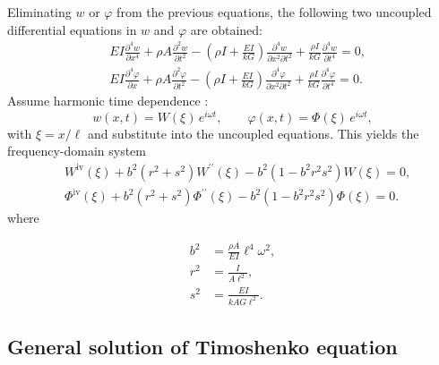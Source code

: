 \documentclass[11pt,a4paper]{article}
\begin{document}
Eliminating $w$ or $\varphi$ from the previous equations, the following two uncoupled differential equations in $w$ and $\varphi$ are obtained:
$$
      \begin{aligned}
             & E I \frac{\partial^4 w}{\partial x^4} + \rho A \frac{\partial^2 w}{\partial t^2} - \left(\rho I + \frac{E I}{k G}\right) \frac{\partial^4 w}{\partial x^2 \partial t^2} + \frac{\rho I}{k G} \frac{\partial^4 w}{\partial t^4} = 0,                        \\[1em]
             & E I \frac{\partial^4 \varphi}{\partial x} + \rho A \frac{\partial^2 \varphi}{\partial t^2} - \left(\rho I + \frac{E I}{k G} \right) \frac{\partial^4 \varphi}{\partial x^2 \partial t^2} + \frac{\rho I}{k G} \frac{\partial^4 \varphi}{\partial t^4} = 0.
      \end{aligned}
$$
Assume harmonic time dependence :
\[
      w(x,t)=W(\xi)\,e^{i\omega t},\qquad \varphi(x,t)=\Phi(\xi)\,e^{i\omega t},
\]
with $\xi=x/\ell$ and substitute into the uncoupled equations. This yields the frequency-domain system
$$
      \begin{aligned}
             & W^{\mathrm{iv}}(\xi) + b^2\left(r^2 + s^2\right) W^{\prime \prime}(\xi) - b^2 \left(1 - b^2 r^2 s^2\right) W(\xi) = 0,          \\[1em]
             & \Phi^{\mathrm{iv}}(\xi) + b^2\left(r^2 + s^2\right) \Phi^{\prime \prime}(\xi) - b^2 \left(1 - b^2 r^2 s^2\right) \Phi(\xi) = 0.
      \end{aligned}
$$
where

\begin{align}
      b^2 & =\frac{\rho A}{E I} \ell ^4 \omega^2, \label{btoomega} \\
      r^2 & =\frac{I}{A \ell^2}, \nonumber                         \\
      s^2 & =\frac{E I}{k A G \ell^2}.  \nonumber
\end{align}

\subsection{General solution of Timoshenko equation}
\end{document}
